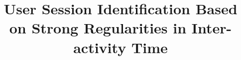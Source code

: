 \documentclass{sig-alternate}
\begin{document}
%

\title{User Session Identification Based on Strong Regularities in Inter-activity Time}
%
%
%
%
%
\end{document}
